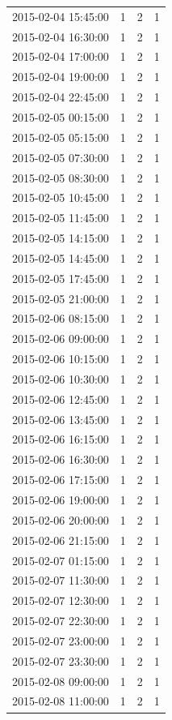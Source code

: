 \begin{tabular}{lrrr}
2015-02-04 15:45:00 & 1 & 2 & 1 \\
2015-02-04 16:30:00 & 1 & 2 & 1 \\
2015-02-04 17:00:00 & 1 & 2 & 1 \\
2015-02-04 19:00:00 & 1 & 2 & 1 \\
2015-02-04 22:45:00 & 1 & 2 & 1 \\
2015-02-05 00:15:00 & 1 & 2 & 1 \\
2015-02-05 05:15:00 & 1 & 2 & 1 \\
2015-02-05 07:30:00 & 1 & 2 & 1 \\
2015-02-05 08:30:00 & 1 & 2 & 1 \\
2015-02-05 10:45:00 & 1 & 2 & 1 \\
2015-02-05 11:45:00 & 1 & 2 & 1 \\
2015-02-05 14:15:00 & 1 & 2 & 1 \\
2015-02-05 14:45:00 & 1 & 2 & 1 \\
2015-02-05 17:45:00 & 1 & 2 & 1 \\
2015-02-05 21:00:00 & 1 & 2 & 1 \\
2015-02-06 08:15:00 & 1 & 2 & 1 \\
2015-02-06 09:00:00 & 1 & 2 & 1 \\
2015-02-06 10:15:00 & 1 & 2 & 1 \\
2015-02-06 10:30:00 & 1 & 2 & 1 \\
2015-02-06 12:45:00 & 1 & 2 & 1 \\
2015-02-06 13:45:00 & 1 & 2 & 1 \\
2015-02-06 16:15:00 & 1 & 2 & 1 \\
2015-02-06 16:30:00 & 1 & 2 & 1 \\
2015-02-06 17:15:00 & 1 & 2 & 1 \\
2015-02-06 19:00:00 & 1 & 2 & 1 \\
2015-02-06 20:00:00 & 1 & 2 & 1 \\
2015-02-06 21:15:00 & 1 & 2 & 1 \\
2015-02-07 01:15:00 & 1 & 2 & 1 \\
2015-02-07 11:30:00 & 1 & 2 & 1 \\
2015-02-07 12:30:00 & 1 & 2 & 1 \\
2015-02-07 22:30:00 & 1 & 2 & 1 \\
2015-02-07 23:00:00 & 1 & 2 & 1 \\
2015-02-07 23:30:00 & 1 & 2 & 1 \\
2015-02-08 09:00:00 & 1 & 2 & 1 \\
2015-02-08 11:00:00 & 1 & 2 & 1 \\

\end{tabular}
